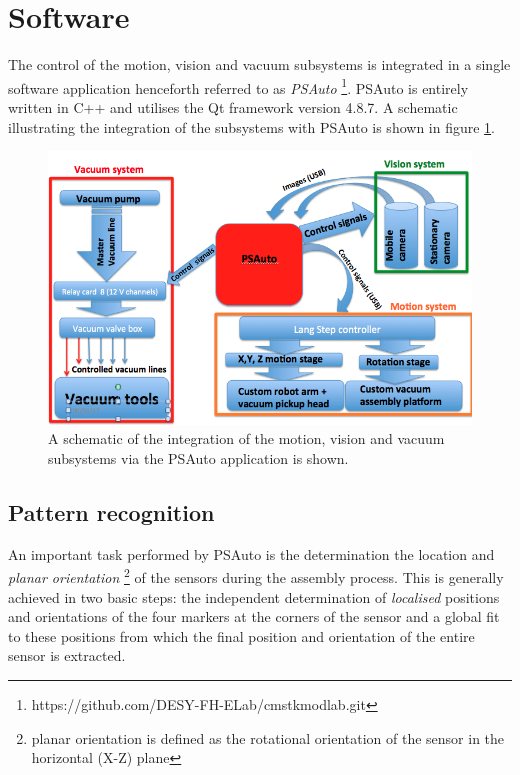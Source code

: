 \documentclass[fleqn,10pt]{SelfArx} %
\begin{document}
\section{Software}
The control of the motion, vision and vacuum subsystems is integrated in a single software application henceforth referred to as \emph{PSAuto} \footnote{https://github.com/DESY-FH-ELab/cmstkmodlab.git}. PSAuto is entirely written in C++ and utilises the Qt framework version 4.8.7.  A schematic illustrating the integration of the subsystems with PSAuto is shown in figure \ref{fig:PSAuto}.


\begin{figure}[ht]\centering %
\includegraphics[width=\linewidth]{PSAuto.png}
\caption{A schematic of the integration of the motion, vision and vacuum subsystems via the PSAuto application is shown.}
\label{fig:PSAuto}
\end{figure}

\subsection{Pattern recognition}
An important task performed by PSAuto is the determination the location and \emph{planar orientation} \footnote{planar orientation is defined as the rotational orientation of the sensor in the horizontal (X-Z) plane} of the sensors during the assembly process. This is generally achieved in two basic steps: the independent determination of \emph{localised} positions and orientations of the four markers at the corners of the sensor and a global fit to these positions from which the final position and orientation of the entire sensor is extracted. 
\end{document}
